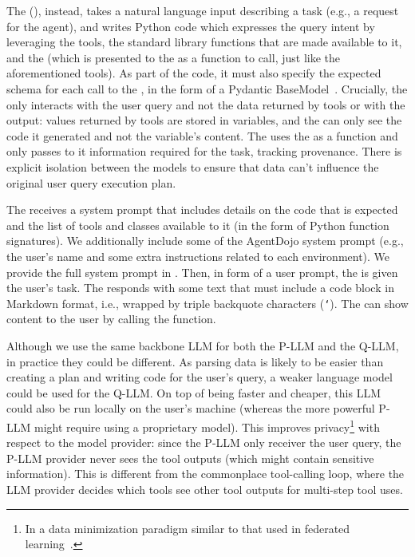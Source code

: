 \documentclass[11pt, a4paper, logo, copyright]{googledeepmind}
\begin{document}
The \rewriter (\pllm), instead, takes a natural language input describing a task (e.g., a request for the agent), and writes Python code which expresses the query intent by leveraging the tools, the standard library functions that are made available to it, and the \qllm (which is presented to the \pllm as a function to call, just like the aforementioned tools). As part of the code, it must also specify the expected schema for each call to the \qllm, in the form of a Pydantic BaseModel~\citep{pydantic}. Crucially, the \pllm{} only interacts with the user query and not the data returned by tools or with the \qllm output: values returned by tools are stored in variables, and the \pllm can only see the code it generated and not the variable's content. The \pllm{} uses the \qllm{} as a function and only passes to it information required for the task, tracking provenance. There is explicit isolation between the models to ensure that data can't influence the original user query execution plan.

The \pllm receives a system prompt that includes details on the code that is expected and the list of tools and classes available to it (in the form of Python function signatures). We additionally include some of the AgentDojo system prompt (e.g., the user's name and some extra instructions related to each environment). We provide the full system prompt in .
Then, in form of a user prompt, the \pllm is given the user's task. The \pllm responds with some text that must include a code block in Markdown format, i.e., wrapped by triple backquote characters (\texttt{\lq}). The \pllm can show content to the user by calling the  function.

Although we use the same backbone LLM for both the P-LLM and the Q-LLM, in practice they could be different. As parsing data is likely to be easier than creating a plan and writing code for the user's query, a weaker language model could be used for the Q-LLM. On top of being faster and cheaper, this LLM could also be run locally on the user's machine (whereas the more powerful P-LLM might require using a proprietary model). This improves privacy\footnote{In a data minimization paradigm similar to that used in federated learning~\citep{mcmahan2023communicationefficientlearningdeepnetworks}.}
with respect to the model provider: since the P-LLM only receiver the user query, the P-LLM provider never sees the tool outputs (which might contain sensitive information). This is different from the commonplace tool-calling loop, where the LLM provider decides which tools see other tool outputs for multi-step tool uses.
\end{document}
